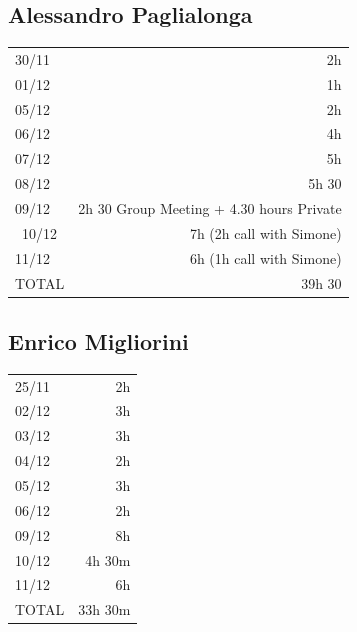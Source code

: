 \documentclass[12pt]{article}
\begin{document}
\subsection{Alessandro Paglialonga}
\begin{tabular}{l r}
30/11 & 2h\\
01/12 & 1h\\
05/12 & 2h\\
06/12 & 4h\\
07/12 & 5h\\
08/12 & 5h 30\\
09/12 & 2h 30 Group Meeting + 4.30 hours Private\\\
10/12 & 7h (2h call with Simone)\\
11/12 & 6h (1h call with Simone)\\ \hline
TOTAL & 39h 30
\end{tabular}
\subsection{Enrico Migliorini}
\begin{tabular}{l r}
25/11 & 2h\\
02/12 & 3h\\
03/12 & 3h\\
04/12 & 2h\\
05/12 & 3h\\
06/12 & 2h\\
09/12 & 8h\\
10/12 & 4h 30m\\
11/12 & 6h\\ \hline
TOTAL & 33h 30m
\end{tabular}
\end{document}
